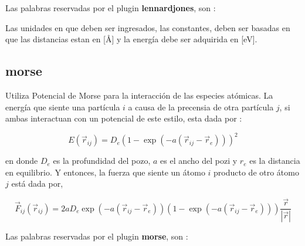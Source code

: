Las palabras reservadas por el plugin \textbf{lennardjones}, son :


Las unidades en que deben ser ingresados, las constantes, deben ser basadas en
que las distancias estan en [\AA] y la energ\'ia debe ser adquirida en [eV].

\subsection{morse}
Utiliza Potencial de Morse para la interacci\'on de las especies at\'omicas. La
energ\'ia que siente una part\'icula $i$ a causa de la precensia de otra
part\'icula $j$, si ambas interactuan con un potencial de este estilo, esta dada
por :

$$E(\vec{r}_{ij}) = D_e\left(1-\exp(-a(\vec{r}_{ij}-\vec{r}_e))\right)^2$$

en donde $D_e$ es la profundidad del pozo, $a$ es el ancho del pozi y $r_e$ es
la distancia en equilibrio. Y entonces, la fuerza que siente un \'atomo $i$
producto de otro \'atomo $j$ est\'a dada por,

$$\vec{F}_{ij} ( \vec{r}_{ij}) =
2aD_e\exp(-a(\vec{r}_{ij}-\vec{r}_e))\left(1-\exp(-a(\vec{r}_{ij}-\vec{r}
_e))\right)\frac{\vec{r}}{|\vec{r}|}$$

Las palabras reservadas por el plugin \textbf{morse}, son :



